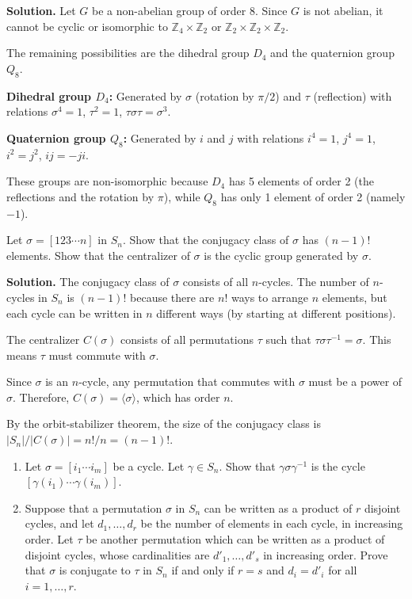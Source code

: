 \noindent\textbf{Solution.} Let $G$ be a non-abelian group of order 8. Since $G$ is not abelian, it cannot be cyclic or isomorphic to $\mathbb{Z}_4 \times \mathbb{Z}_2$ or $\mathbb{Z}_2 \times \mathbb{Z}_2 \times \mathbb{Z}_2$.

The remaining possibilities are the dihedral group $D_4$ and the quaternion group $Q_8$.

\textbf{Dihedral group $D_4$:} Generated by $\sigma$ (rotation by $\pi/2$) and $\tau$ (reflection) with relations $\sigma^4 = 1$, $\tau^2 = 1$, $\tau\sigma\tau = \sigma^3$.

\textbf{Quaternion group $Q_8$:} Generated by $i$ and $j$ with relations $i^4 = 1$, $j^4 = 1$, $i^2 = j^2$, $ij = -ji$.

These groups are non-isomorphic because $D_4$ has 5 elements of order 2 (the reflections and the rotation by $\pi$), while $Q_8$ has only 1 element of order 2 (namely $-1$).

\begin{problembox}
Let $\sigma = [123 \cdots n]$ in $S_n$. Show that the conjugacy class of $\sigma$ has $(n - 1)!$ elements. Show that the centralizer of $\sigma$ is the cyclic group generated by $\sigma$.
\end{problembox}

\noindent\textbf{Solution.} The conjugacy class of $\sigma$ consists of all $n$-cycles. The number of $n$-cycles in $S_n$ is $(n-1)!$ because there are $n!$ ways to arrange $n$ elements, but each cycle can be written in $n$ different ways (by starting at different positions).

The centralizer $C(\sigma)$ consists of all permutations $\tau$ such that $\tau\sigma\tau^{-1} = \sigma$. This means $\tau$ must commute with $\sigma$.

Since $\sigma$ is an $n$-cycle, any permutation that commutes with $\sigma$ must be a power of $\sigma$. Therefore, $C(\sigma) = \langle \sigma \rangle$, which has order $n$.

By the orbit-stabilizer theorem, the size of the conjugacy class is $|S_n|/|C(\sigma)| = n!/n = (n-1)!$.

\begin{problembox}
\begin{enumerate}[label=(\alph*)]
\item Let $\sigma = [i_1 \cdots i_m]$ be a cycle. Let $\gamma \in S_n$. Show that $\gamma\sigma\gamma^{-1}$ is the cycle $[\gamma(i_1) \cdots \gamma(i_m)]$.
\item Suppose that a permutation $\sigma$ in $S_n$ can be written as a product of $r$ disjoint cycles, and let $d_1, \ldots, d_r$ be the number of elements in each cycle, in increasing order. Let $\tau$ be another permutation which can be written as a product of disjoint cycles, whose cardinalities are $d'_1, \ldots, d'_s$ in increasing order. Prove that $\sigma$ is conjugate to $\tau$ in $S_n$ if and only if $r = s$ and $d_i = d'_i$ for all $i = 1, \ldots, r$.
\end{enumerate}
\end{problembox}

